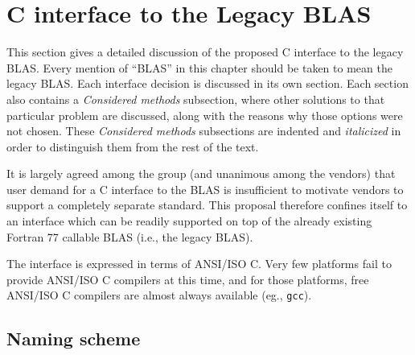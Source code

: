 \documentclass{article}
\begin{document}
%
%


\section{C interface to the Legacy BLAS}\label{legacy:c}

 
This section gives a detailed discussion of the proposed C interface to the
legacy BLAS.  Every mention of ``BLAS'' in this chapter should be taken to mean
the legacy BLAS.  Each interface decision is discussed in its own section. 
Each section also contains a {\em Considered methods} subsection, where
other solutions to that particular problem are discussed, along with
the reasons why those options were not chosen.  These {\em Considered methods}
subsections are indented and {\it italicized} in order to distinguish them
from the rest of the text.

It is largely agreed among the group (and unanimous among the vendors)
that user demand for a C interface to the BLAS is insufficient to motivate
vendors to support a completely separate standard.  This proposal therefore
confines itself to an interface
which can be readily supported on top of the already existing
Fortran 77 callable BLAS (i.e., the legacy BLAS).

The interface is expressed in terms of ANSI/ISO C.  Very few platforms fail
to provide ANSI/ISO C compilers at this time, and for those platforms, free
ANSI/ISO C compilers are almost always available (eg., {\tt gcc}).

\subsection{Naming scheme}\label{legacy:c_namingscheme}

\end{document}
